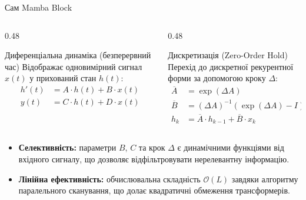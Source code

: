 \begin{frame}{Сам Mamba Block}
    \small
    \begin{columns}[T]
        \begin{column}{0.48\textwidth}
            \begin{block}{Диференціальна динаміка (безперервний час)}
                Відображає одновимірний сигнал $x(t)$ у прихований стан $h(t)$:
                \vspace{-0.2cm}
                \begin{align*}
                    h'(t) &= A \cdot h(t) + B \cdot x(t) \\
                    y(t) &= C \cdot h(t) + D \cdot x(t)
                \end{align*}
            \end{block}
        \end{column}

        \begin{column}{0.48\textwidth}
            \begin{exampleblock}{Дискретизація (Zero-Order Hold)}
                Перехід до дискретної рекурентної форми за допомогою кроку $\Delta$:
                \vspace{-0.2cm}
                \begin{align*}
                    \overline{A} &= \exp(\Delta A) \\
                    \overline{B} &= (\Delta A)^{-1}(\exp(\Delta A) - I) \cdot \Delta B \\
                    h_k &= \overline{A} \cdot h_{k-1} + \overline{B} \cdot x_k
                \end{align*}
            \end{exampleblock}
        \end{column}
    \end{columns}

    \begin{itemize}
        \item \textbf{Селективність:} параметри $B$, $C$ та крок $\Delta$ є динамічними функціями від вхідного сигналу, що дозволяє відфільтровувати нерелевантну інформацію.
        \item \textbf{Лінійна ефективність:} обчислювальна складність $\mathcal{O}(L)$ завдяки алгоритму паралельного сканування, що долає квадратичні обмеження трансформерів.
    \end{itemize}
\end{frame}

